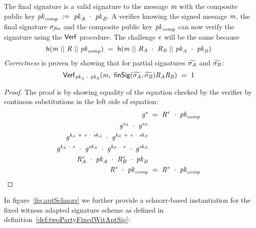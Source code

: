 The final signature is a valid signature to the message $\mathit{m}$ with the composite public key $\mathit{pk}_{\mathit{comp}} ~:=~ \mathit{pk}_{\mathit{A}} ~\cdot~ \mathit{pk}_{\mathit{B}}$.
A verifier knowing the signed message $\mathit{m}$, the final signature $\sigma_{\mathit{fin}}$ and the composite public key $\mathit{pk}_{\mathit{comp}}$ can now verify the signature using the $\mathsf{Verf}$ procedure.
The challenge $\mathit{e}$ will be the same because
\[ \mathsf{h} (\mathit{m} ~||~ \mathit{R} ~||~ \mathit{pk}_{\mathit{comp}}) ~=~ \mathsf{h} (\mathit{m} ~||~ \mathit{R}_{\mathit{A}} ~\cdot~ \mathit{R}_{\mathit{B}} ~||~ \mathit{pk}_{\mathit{A}} ~\cdot~ \mathit{pk}_{\mathit{B}}) \]
\textit{Correctness} is proven by showing
that for partial signatures $\widetilde{\sigma_{\mathit{A}}}$ and $\widetilde{\sigma_{\mathit{B}}}$:
\[ \mathsf{Verf}_{\mathit{pk}_{\mathit{A}} ~\cdot~ \mathit{pk}_{\mathit{B}}}(\mathit{m} ,~ \mathsf{finSig}(\widetilde{\sigma_{\mathit{A}}},\widetilde{\sigma_{\mathit{B}}}){\mathit{R}_{\mathit{A}}}{\mathit{R}_{\mathit{B}}}) ~=~ 1 \]

\begin{proof}
    \label{prf:twopartySchnorr}
    The proof is by showing equality of the equation checked by the verifier by continous substitutions in the left side of equation:
    \begin{align}
        \mathit{g}^{\mathit{s}} &~=~ \mathit{R}^{\mathit{e}} ~\cdot~ \mathit{pk}_{\mathit{comp}} \\
        \mathit{g}^{\mathit{s}_{\mathit{A}}} ~\cdot~ \mathit{g}^{\mathit{s}_{\mathit{B}}} & \\
        \mathit{g}^{\mathit{\mathit{k}_{\mathit{A}}} ~+~ \mathit{e} ~\cdot~ \mathit{sk}_{\mathit{A}}} ~\cdot~ \mathit{g}^{\mathit{\mathit{k}_{\mathit{B}}} ~+~ \mathit{e} ~\cdot~ \mathit{sk}_{\mathit{B}}} & \\
        \mathit{g}^{\mathit{\mathit{k}_{\mathit{A}}} ~\cdot~ \mathit{e}} ~\cdot~ \mathit{g}^{\mathit{sk}_{\mathit{A}}} ~\cdot~ \mathit{g}^{\mathit{\mathit{k}_{\mathit{B}}} ~\cdot~ \mathit{e}} ~\cdot~ \mathit{g}^{\mathit{sk}_{\mathit{B}}} & \\
        \mathit{R}_{\mathit{A}}^{\mathit{e}} ~\cdot~ \mathit{pk}_{\mathit{A}} ~\cdot~ \mathit{R}_{\mathit{B}}^{\mathit{e}} ~\cdot~ \mathit{pk}_{\mathit{B}} & \\
        \mathit{R}^{\mathit{e}} ~\cdot~ \mathit{pk}_{\mathit{comp}} & ~=~ \mathit{R}^{\mathit{e}} ~\cdot~ \mathit{pk}_{\mathit{comp}}
    \end{align}
\end{proof}

In figure~\ref{fig:aptSchnorr} we further provide a schnorr-based instantiation for the fixed witness adapted signature scheme as defined in definition~\ref{def:twoPartyFixedWitAptSig}:

